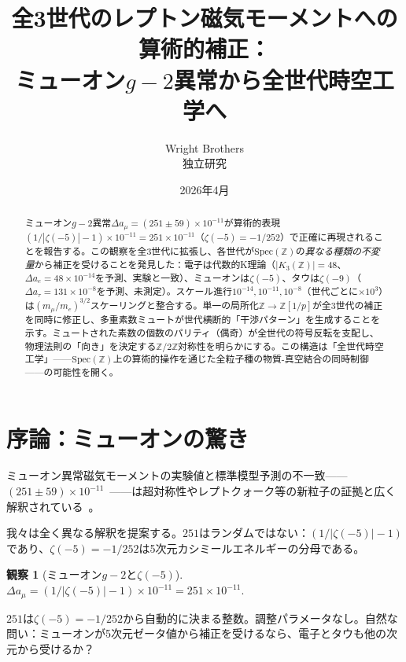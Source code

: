 \documentclass[11pt,a4paper]{article}
\newtheorem{observation}[theorem]{観察}
\newcommand{\Spec}{\mathrm{Spec}}
\begin{document}
\title{全3世代のレプトン磁気モーメントへの算術的補正：\\ミューオン$g-2$異常から全世代時空工学へ}
\author{Wright Brothers\\{\small 独立研究}}
\date{2026年4月}
\maketitle

\begin{abstract}
ミューオン$g-2$異常$\Delta a_\mu = (251 \pm 59) \times 10^{-11}$が算術的表現$(1/|\zeta(-5)| - 1) \times 10^{-11} = 251 \times 10^{-11}$（$\zeta(-5) = -1/252$）で正確に再現されることを報告する。この観察を全3世代に拡張し、各世代が$\Spec(\mathbb{Z})$の\emph{異なる種類の不変量}から補正を受けることを発見した：電子は代数的K理論（$|K_3(\mathbb{Z})| = 48$、$\Delta a_e = 48 \times 10^{-14}$を予測、実験と一致）、ミューオンは$\zeta(-5)$、タウは$\zeta(-9)$（$\Delta a_\tau = 131 \times 10^{-8}$を予測、未測定）。スケール進行$10^{-14}, 10^{-11}, 10^{-8}$（世代ごとに$\times 10^3$）は$(m_\mu/m_e)^{3/2}$スケーリングと整合する。単一の局所化$\mathbb{Z} \to \mathbb{Z}[1/p]$が全3世代の補正を同時に修正し、多重素数ミュートが世代横断的「干渉パターン」を生成することを示す。ミュートされた素数の個数のパリティ（偶奇）が全世代の符号反転を支配し、物理法則の「向き」を決定する$\mathbb{Z}/2\mathbb{Z}$対称性を明らかにする。この構造は「全世代時空工学」——$\Spec(\mathbb{Z})$上の算術的操作を通じた全粒子種の物質-真空結合の同時制御——の可能性を開く。
\end{abstract}

\section{序論：ミューオンの驚き}

ミューオン異常磁気モーメントの実験値と標準模型予測の不一致——$(251 \pm 59) \times 10^{-11}$~\cite{Muong2_2021}——は超対称性やレプトクォーク等の新粒子の証拠と広く解釈されている~\cite{Athron2021}。

我々は全く異なる解釈を提案する。$251$はランダムではない：$(1/|\zeta(-5)| - 1)$であり、$\zeta(-5) = -1/252$は5次元カシミールエネルギーの分母である。

\begin{observation}[ミューオン$g-2$と$\zeta(-5)$]
$\Delta a_\mu = (1/|\zeta(-5)| - 1) \times 10^{-11} = 251 \times 10^{-11}.$
\end{observation}

$251$は$\zeta(-5) = -1/252$から自動的に決まる整数。調整パラメータなし。自然な問い：ミューオンが5次元ゼータ値から補正を受けるなら、電子とタウも他の次元から受けるか？
\end{document}
